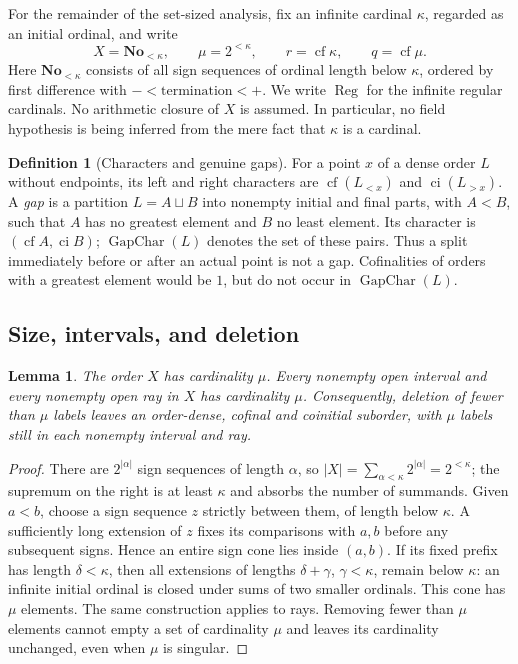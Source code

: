 \documentclass[11pt]{article}
\newtheorem{lemma}[lemma]{Lemma}
\theoremstyle{definition}
\newtheorem{definition}[definition]{Definition}
\theoremstyle{remark}
\newcommand{\No}{\mathbf{No}}
\newcommand{\cf}{\operatorname{cf}}
\newcommand{\ci}{\operatorname{ci}}
\newcommand{\GapChar}{\operatorname{GapChar}}
\newcommand{\Reg}{\operatorname{Reg}}
\begin{document}

For the remainder of the set-sized analysis, fix an infinite cardinal
$\kappa$, regarded as an initial ordinal, and write
\[\tag{S17.3}\label{swo:gs:eq:parameters}
 X=\No_{<\kappa},\qquad \mu=2^{<\kappa},\qquad
 r=\cf\kappa,\qquad q=\cf\mu.
\]
Here $\No_{<\kappa}$ consists of all sign sequences of ordinal length below
$\kappa$, ordered by first difference with $-<\text{termination}<+$.
We write $\Reg$ for the infinite regular cardinals.
No arithmetic closure of $X$ is assumed. In particular, no field hypothesis
is being inferred from the mere fact that $\kappa$ is a cardinal.

\begin{definition}[Characters and genuine gaps]\label{swo:gs:n4.1}
For a point $x$ of a dense order $L$ without endpoints, its left and right
characters are $\cf(L_{<x})$ and $\ci(L_{>x})$. A \emph{gap} is a partition
$L=A\sqcup B$ into nonempty initial and final parts, with $A<B$, such that
$A$ has no greatest element and $B$ no least element. Its character is
$(\cf A,\ci B)$; $\GapChar(L)$ denotes the set of these pairs. Thus a split
immediately before or after an actual point is not a gap. Cofinalities of
orders with a greatest element would be $1$, but do not occur in
$\GapChar(L)$.
\end{definition}

\subsection{Size, intervals, and deletion}
\begin{lemma}\label{swo:gs:lem:alphabet-size}
The order $X$ has cardinality $\mu$. Every nonempty open interval and every
nonempty open ray in $X$ has cardinality $\mu$. Consequently, deletion of
fewer than $\mu$ labels leaves an order-dense, cofinal and coinitial
suborder, with $\mu$ labels still in each nonempty interval and ray.
\end{lemma}
\begin{proof}
There are $2^{|\alpha|}$ sign sequences of length $\alpha$, so
$|X|=\sum_{\alpha<\kappa}2^{|\alpha|}=2^{<\kappa}$; the supremum on the
right is at least $\kappa$ and absorbs the number of summands.
Given $a<b$, choose a sign sequence $z$ strictly between them, of length
below $\kappa$. A sufficiently long extension of $z$ fixes its comparisons
with $a,b$ before any subsequent signs. Hence an entire sign cone lies
inside $(a,b)$. If its fixed prefix has length $\delta<\kappa$, then all
extensions of lengths $\delta+\gamma$, $\gamma<\kappa$, remain below
$\kappa$: an infinite initial ordinal is closed under sums of two smaller
ordinals. This cone has $\mu$ elements. The same construction applies to
rays. Removing fewer than $\mu$ elements cannot empty a set of cardinality
$\mu$ and leaves its cardinality unchanged, even when $\mu$ is singular.
\end{proof}
\end{document}
